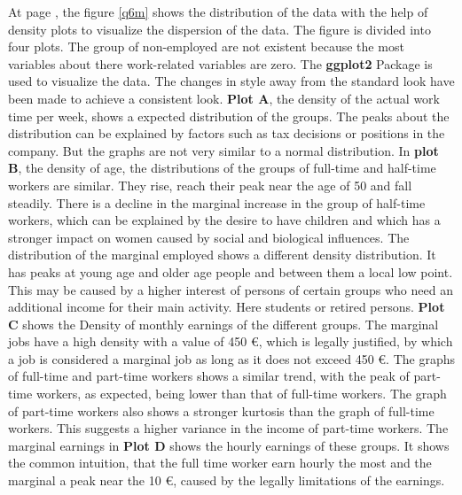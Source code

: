 \documentclass[a4paper]{article}
\begin{document}
At page \pageref{q6m}, the figure \ref{q6m} shows the distribution of the data with the help of density plots to visualize the dispersion of the data. The figure is divided into four plots. The group of non-employed are not existent because the most variables about there work-related variables are zero. The \textbf{ggplot2} Package is used to visualize the data. The changes in style away from the standard look have been made to achieve a consistent look. \textbf{Plot A}, the density of the actual work time per week, shows a expected distribution of the groups. The peaks about the distribution can be explained by factors such as tax decisions or positions in the company. But the graphs are not very similar to a normal distribution. In \textbf{plot B}, the density of age, the distributions of the groups of full-time and half-time workers are similar. They rise, reach their peak near the age of 50 and fall steadily. There is a decline in the marginal increase in the group of half-time workers, which can be explained by the desire to have children and which has a stronger impact on women caused by social and biological influences. The distribution of the marginal employed shows a different density distribution. It has peaks at young age and older age people and between them a local low point. This may be caused by a higher interest of persons of certain groups who need an additional income for their main activity. Here students or retired persons. \textbf{Plot C} shows the Density of monthly earnings of the different groups. The marginal jobs have a high density with a value of 450 {\euro}, which is legally justified, by which a job is considered a marginal job as long as it does not exceed 450 {\euro}. The graphs of full-time and part-time workers shows a similar trend, with the peak of part-time workers, as expected, being lower than that of full-time workers. The graph of part-time workers also shows a stronger kurtosis than the graph of full-time workers. This suggests a higher variance in the income of part-time workers. The marginal earnings in \textbf{Plot D} shows the hourly earnings of these groups. It shows the common intuition, that the full time worker earn hourly the most and the marginal a peak near the 10 {\euro}, caused by the legally limitations of the earnings. 
\end{document}
